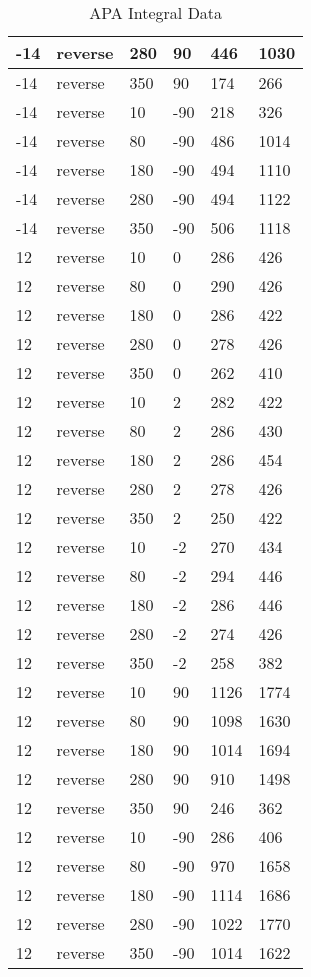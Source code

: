 \begin{table}
\begin{center}
\begin{tabular}{|l|l|l|l|l|l|}
			-14 & reverse & 280 & 90 & 446 & 1030 \\
			\hline
			-14 & reverse & 350 & 90 & 174 & 266 \\
			\hline
			-14 & reverse & 10 & -90 & 218 & 326 \\
			\hline
			-14 & reverse & 80 & -90 & 486 & 1014 \\
			\hline
			-14 & reverse & 180 & -90 & 494 & 1110 \\
			\hline
			-14 & reverse & 280 & -90 & 494 & 1122 \\
			\hline
			-14 & reverse & 350 & -90 & 506 & 1118 \\
			\hline
			12 & reverse & 10 & 0 & 286 & 426 \\
			\hline
			12 & reverse & 80 & 0 & 290 & 426 \\
			\hline
			12 & reverse & 180 & 0 & 286 & 422 \\
			\hline
			12 & reverse & 280 & 0 & 278 & 426 \\
			\hline
			12 & reverse & 350 & 0 & 262 & 410 \\
			\hline
			12 & reverse & 10 & 2 & 282 & 422 \\
			\hline
			12 & reverse & 80 & 2 & 286 & 430 \\
			\hline
			12 & reverse & 180 & 2 & 286 & 454 \\
			\hline
			12 & reverse & 280 & 2 & 278 & 426 \\
			\hline
			12 & reverse & 350 & 2 & 250 & 422 \\
			\hline
			12 & reverse & 10 & -2 & 270 & 434 \\
			\hline
			12 & reverse & 80 & -2 & 294 & 446 \\
			\hline
			12 & reverse & 180 & -2 & 286 & 446 \\
			\hline
			12 & reverse & 280 & -2 & 274 & 426 \\
			\hline
			12 & reverse & 350 & -2 & 258 & 382 \\
			\hline
			12 & reverse & 10 & 90 & 1126 & 1774 \\
			\hline
			12 & reverse & 80 & 90 & 1098 & 1630 \\
			\hline
			12 & reverse & 180 & 90 & 1014 & 1694 \\
			\hline
			12 & reverse & 280 & 90 & 910 & 1498 \\
			\hline
			12 & reverse & 350 & 90 & 246 & 362 \\
			\hline
			12 & reverse & 10 & -90 & 286 & 406 \\
			\hline
			12 & reverse & 80 & -90 & 970 & 1658 \\
			\hline
			12 & reverse & 180 & -90 & 1114 & 1686 \\
			\hline
			12 & reverse & 280 & -90 & 1022 & 1770 \\
			\hline
			12 & reverse & 350 & -90 & 1014 & 1622 \\
			\hline
		\end{tabular}
	\end{center}
	\caption{APA Integral Data}
	\label{tab:apa_sum}
\end{table}